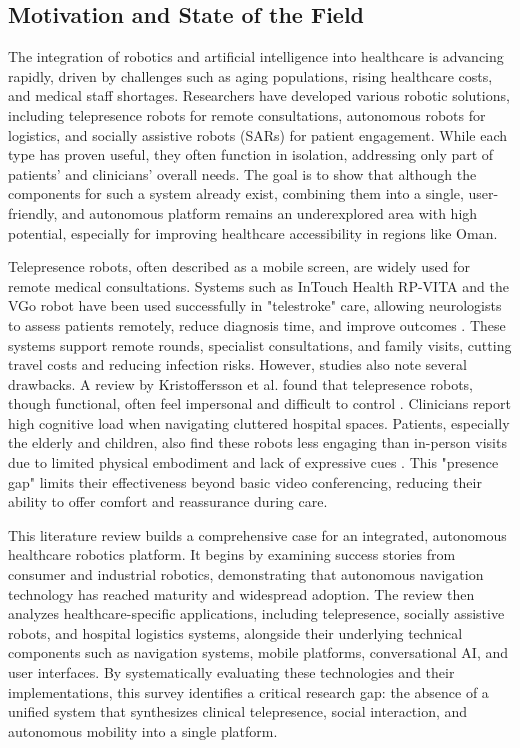\subsection{Motivation and State of the Field}

The integration of robotics and artificial intelligence into healthcare is advancing rapidly, driven by challenges such as aging populations, rising healthcare costs, and medical staff shortages. Researchers have developed various robotic solutions, including telepresence robots for remote consultations, autonomous robots for logistics, and socially assistive robots (SARs) for patient engagement. While each type has proven useful, they often function in isolation, addressing only part of patients' and clinicians' overall needs. The goal is to show that although the components for such a system already exist, combining them into a single, user-friendly, and autonomous platform remains an underexplored area with high potential, especially for improving healthcare accessibility in regions like Oman.

Telepresence robots, often described as a mobile screen, are widely used for remote medical consultations. Systems such as InTouch Health RP-VITA and the VGo robot have been used successfully in "telestroke" care, allowing neurologists to assess patients remotely, reduce diagnosis time, and improve outcomes \cite{garingo2016}. These systems support remote rounds, specialist consultations, and family visits, cutting travel costs and reducing infection risks. However, studies also note several drawbacks. A review by Kristoffersson et al. found that telepresence robots, though functional, often feel impersonal and difficult to control \cite{kristoffersson2013}. Clinicians report high cognitive load when navigating cluttered hospital spaces. Patients, especially the elderly and children, also find these robots less engaging than in-person visits due to limited physical embodiment and lack of expressive cues \cite{sabanovic2013}. This "presence gap" limits their effectiveness beyond basic video conferencing, reducing their ability to offer comfort and reassurance during care.

This literature review builds a comprehensive case for an integrated, autonomous healthcare robotics platform. It begins by examining success stories from consumer and industrial robotics, demonstrating that autonomous navigation technology has reached maturity and widespread adoption. The review then analyzes healthcare-specific applications, including telepresence, socially assistive robots, and hospital logistics systems, alongside their underlying technical components such as navigation systems, mobile platforms, conversational AI, and user interfaces. By systematically evaluating these technologies and their implementations, this survey identifies a critical research gap: the absence of a unified system that synthesizes clinical telepresence, social interaction, and autonomous mobility into a single platform.

